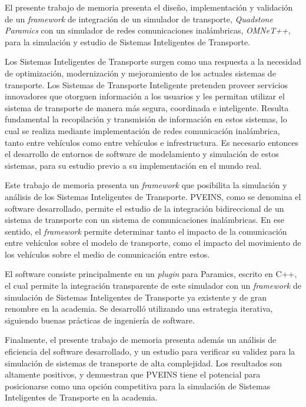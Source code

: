 El presente trabajo de memoria presenta el diseño, implementación y validación de un \emph{framework} de integración de un simulador de transporte, \emph{Quadstone Paramics} con un simulador de redes comunicaciones inalámbricas, \emph{OMNeT++}, para la simulación y estudio de Sistemas Inteligentes de Transporte.

Los Sistemas Inteligentes de Transporte surgen como una respuesta a la necesidad de optimización, modernización y mejoramiento de los actuales sistemas de transporte. Los Sistemas de Transporte Inteligente pretenden proveer servicios innovadores que otorguen información a los usuarios y les permitan utilizar el sistema de transporte de manera más segura, coordinada e inteligente. Resulta fundamental la recopilación y transmisión de información en estos sistemas, lo cual se realiza mediante implementación de redes comunicación inalámbrica, tanto entre vehículos como entre vehículos e infrestructura. Es necesario entonces el desarrollo de entornos de software de modelamiento y simulación de estos sistemas, para su estudio previo a su implementación en el mundo real.

Este trabajo de memoria presenta un \emph{framework} que posibilita la simulación y análisis de los Sistemas Inteligentes de Transporte. PVEINS, como se denomina el software desarrollado, permite el estudio de la integración bidireccional de un sistema de transporte con un sistema de comunicaciones inalámbricas. En ese sentido, el \emph{framework} permite determinar tanto el impacto de la comunicación entre vehículos sobre el modelo de transporte, como el impacto del movimiento de los vehículos sobre el medio de comunicación entre estos.

El software consiste principalmente en un \emph{plugin} para Paramics, escrito en C++, el cual permite la integración transparente de este simulador con un \emph{framework} de simulación de Sistemas Inteligentes de Transporte ya existente y de gran renombre en la academia. Se desarrolló utilizando una estrategia iterativa, siguiendo buenas prácticas de ingeniería de software.

Finalmente, el presente trabajo de memoria presenta además un análisis de eficiencia del software desarrollado, y un estudio para verificar su validez para la simulación de sistemas de transporte de alta complejidad. Los resultados son altamente positivos, y demuestran que PVEINS tiene el potencial para posicionarse como una opción competitiva para la simulación de Sistemas Inteligentes de Transporte en la academia.